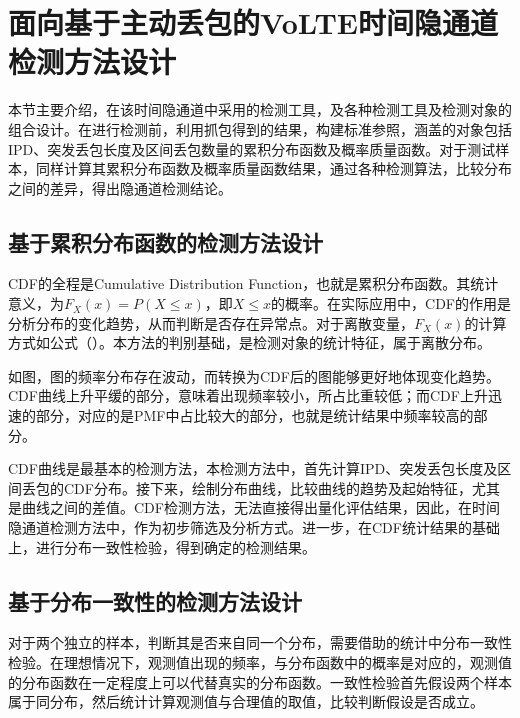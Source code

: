 \section{面向基于主动丢包的VoLTE时间隐通道检测方法设计}
\label{chap:analyze:statistical}

本节主要介绍，在该时间隐通道中采用的检测工具，及各种检测工具及检测对象的组合设计。在进行检测前，利用抓包得到的结果，构建标准参照，涵盖的对象包括IPD、突发丢包长度及区间丢包数量的累积分布函数及概率质量函数。对于测试样本，同样计算其累积分布函数及概率质量函数结果，通过各种检测算法，比较分布之间的差异，得出隐通道检测结论。

\subsection{基于累积分布函数的检测方法设计}
\label{chap:analyze:statistical:cdf}

CDF的全程是Cumulative Distribution Function，也就是累积分布函数。其统计意义，为$F_{X}(x)=P (X\leq x)$，即$X\leq x$的概率。在实际应用中，CDF的作用是分析分布的变化趋势，从而判断是否存在异常点。对于离散变量，$F_{X}(x)$的计算方式如公式（）。本方法的判别基础，是检测对象的统计特征，属于离散分布。


如图，图的频率分布存在波动，而转换为CDF后的图能够更好地体现变化趋势。CDF曲线上升平缓的部分，意味着出现频率较小，所占比重较低；而CDF上升迅速的部分，对应的是PMF中占比较大的部分，也就是统计结果中频率较高的部分。

CDF曲线是最基本的检测方法，本检测方法中，首先计算IPD、突发丢包长度及区间丢包的CDF分布。接下来，绘制分布曲线，比较曲线的趋势及起始特征，尤其是曲线之间的差值。CDF检测方法，无法直接得出量化评估结果，因此，在时间隐通道检测方法中，作为初步筛选及分析方式。进一步，在CDF统计结果的基础上，进行分布一致性检验，得到确定的检测结果。

\subsection{基于分布一致性的检测方法设计}
\label{chap:analyze:statistical:test}

对于两个独立的样本，判断其是否来自同一个分布，需要借助的统计中分布一致性检验。在理想情况下，观测值出现的频率，与分布函数中的概率是对应的，观测值的分布函数在一定程度上可以代替真实的分布函数。一致性检验首先假设两个样本属于同分布，然后统计计算观测值与合理值的取值，比较判断假设是否成立。

